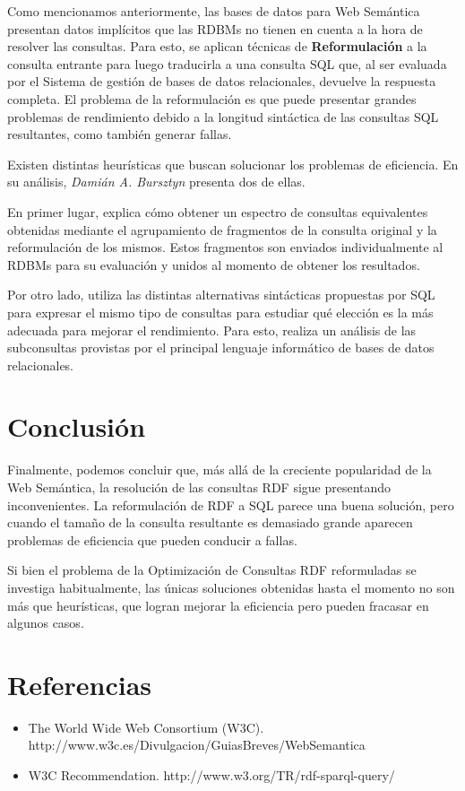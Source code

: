 \documentclass[10pt,a4paper]{article}
\begin{document}
Como mencionamos anteriormente, las bases de datos para Web Semántica presentan datos implícitos que las RDBMs no tienen en cuenta a la hora de resolver las consultas. Para esto, se aplican técnicas de \textbf{Reformulación} a la consulta entrante para luego traducirla a una consulta SQL que, al ser evaluada por el Sistema de gestión de bases de datos relacionales, devuelve la respuesta completa. El problema de la reformulación es que puede presentar grandes problemas de rendimiento debido a la longitud sintáctica de las consultas SQL resultantes, como también generar fallas.

Existen distintas heurísticas que buscan solucionar los problemas de eficiencia. En su análisis, \textit{Damián A. Bursztyn} presenta dos de ellas.

En primer lugar, explica cómo obtener un espectro de consultas equivalentes obtenidas mediante el agrupamiento de fragmentos de la consulta original y la reformulación de los mismos. Estos fragmentos son enviados individualmente al RDBMs para su evaluación y unidos al momento de obtener los resultados.

Por otro lado, utiliza las distintas alternativas sintácticas propuestas por SQL para expresar el mismo tipo de consultas para estudiar qué elección es la más adecuada para mejorar el rendimiento. Para esto, realiza un análisis de las subconsultas provistas por el principal lenguaje informático de bases de datos relacionales.

\section{Conclusión}
Finalmente, podemos concluir que, más allá de la creciente popularidad de la Web Semántica, la resolución de las consultas RDF sigue presentando inconvenientes. La reformulación de RDF a SQL parece una buena solución, pero cuando el tamaño de la consulta resultante es demasiado grande aparecen problemas de eficiencia que pueden conducir a fallas. 

Si bien el problema de la Optimización de Consultas RDF reformuladas se investiga habitualmente, las únicas soluciones obtenidas hasta el momento no son más que heurísticas, que logran mejorar la eficiencia pero pueden fracasar en algunos casos.

\section{Referencias}

\begin{itemize}
\item The World Wide Web Consortium (W3C). http://www.w3c.es/Divulgacion/GuiasBreves/WebSemantica
\item W3C Recommendation. http://www.w3.org/TR/rdf-sparql-query/
\end{itemize}
\end{document}
